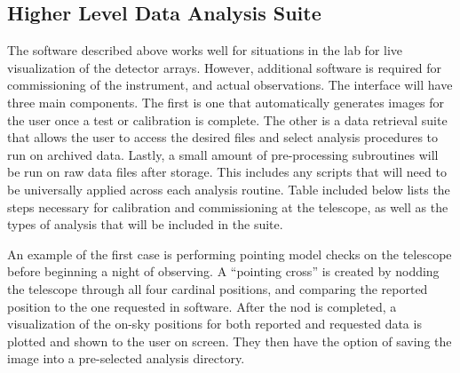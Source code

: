 \documentclass[manuscript]{aastex}
\begin{document}
\subsection{\textbf{Higher Level Data Analysis Suite}}

The software described above works well for situations in the lab for live visualization of the detector arrays. However, additional software is required for commissioning of the instrument, and actual observations. The interface will have three main components. The first is one that automatically generates images for the user once a test or calibration is complete. The other is a data retrieval suite that allows the user to access the desired files and select analysis procedures to run on archived data. Lastly, a small amount of pre-processing subroutines will be run on raw data files after storage. This includes any scripts that will need to be universally applied across each analysis routine. Table included below lists the steps necessary for calibration and commissioning at the telescope, as well as the types of analysis that will be included in the suite. 

An example of the first case is performing pointing model checks on the telescope before beginning a night of observing. A ``pointing cross'' is created by nodding the telescope through all four cardinal positions, and comparing the reported position to the one requested in software. After the nod is completed, a visualization of the on-sky positions for both reported and requested data is plotted and shown to the user on screen. They then have the option of saving the image into a pre-selected analysis directory. 
\end{document}
